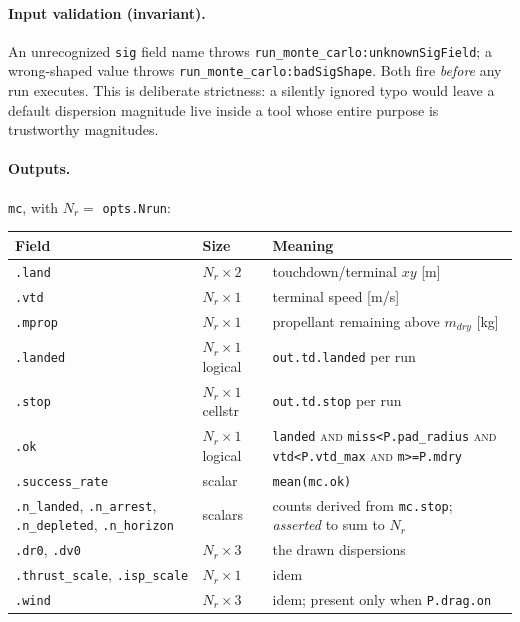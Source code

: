 \documentclass[11pt]{article}
\begin{document}
\paragraph{Input validation (invariant).} An unrecognized \texttt{sig} field
name throws \texttt{run\_monte\_carlo:unknownSigField}; a wrong-shaped value
throws \texttt{run\_monte\_carlo:badSigShape}. Both fire \emph{before} any
run executes. This is deliberate strictness: a silently ignored typo would
leave a default dispersion magnitude live inside a tool whose entire purpose
is trustworthy magnitudes.

\paragraph{Outputs.} \texttt{mc}, with $N_r = $ \texttt{opts.Nrun}:

\begin{center}
\begin{tabular}{@{}llL{7.2cm}@{}}
\toprule
Field & Size & Meaning \\
\midrule
\texttt{.land} & $N_r\times2$ & touchdown/terminal $xy$ [m] \\
\texttt{.vtd} & $N_r\times1$ & terminal speed [m/s] \\
\texttt{.mprop} & $N_r\times1$ & propellant remaining above $m_{dry}$ [kg] \\
\texttt{.landed} & $N_r\times1$ logical & \texttt{out.td.landed} per run \\
\texttt{.stop} & $N_r\times1$ cellstr & \texttt{out.td.stop} per run \\
\texttt{.ok} & $N_r\times1$ logical & \texttt{landed} \textsc{and}
  \texttt{miss<P.pad\_radius} \textsc{and} \texttt{vtd<P.vtd\_max}
  \textsc{and} \texttt{m>=P.mdry} \\
\texttt{.success\_rate} & scalar & \texttt{mean(mc.ok)} \\
\texttt{.n\_landed}, \texttt{.n\_arrest}, \texttt{.n\_depleted},
  \texttt{.n\_horizon} & scalars &
  counts derived from \texttt{mc.stop}; \emph{asserted} to sum to $N_r$ \\
\texttt{.dr0}, \texttt{.dv0} & $N_r\times3$ & the drawn dispersions \\
\texttt{.thrust\_scale}, \texttt{.isp\_scale} & $N_r\times1$ & idem \\
\texttt{.wind} & $N_r\times3$ & idem; present only when \texttt{P.drag.on} \\
\bottomrule
\end{tabular}
\end{center}
\end{document}
